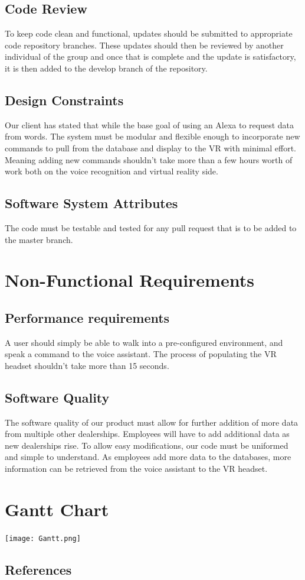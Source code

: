 \documentclass[onecolumn, draftclsnofoot,10pt, compsoc]{IEEEtran}
\begin{document}
        \subsection{Code Review}
            To keep code clean and functional, updates should be submitted to appropriate code repository branches. These updates should then be reviewed by another individual of the group and once that is complete and the update is satisfactory, it is then added to the develop branch of the repository.

    \subsection{Design Constraints}
        Our client has stated that while the base goal of using an Alexa to request data from words. The system must be modular and flexible enough to incorporate new commands to pull from the database and display to the VR with minimal effort. Meaning adding new commands shouldn’t take more than a few hours worth of work both on the voice recognition and virtual reality side.


    \subsection{Software System Attributes}
        The code must be testable and tested for any pull request that is to be added to the master branch.


\section{Non-Functional Requirements}

\subsection{Performance requirements}
    A user should simply be able to walk into a pre-configured environment, and speak a command to the voice assistant. The process of populating the VR headset shouldn't take more than 15 seconds.
\subsection{Software Quality}
   The software quality of our product must allow for further addition of more data from multiple other dealerships. Employees will have to add additional data as new dealerships rise. To allow easy modifications, our code must be uniformed and simple to understand. As employees add more data to the databases, more information can be retrieved from the voice assistant to the VR headset.

\section{Gantt Chart}
\texttt{[image: Gantt.png]}
\newpage
\subsection{References}
        
        
\end{document}
